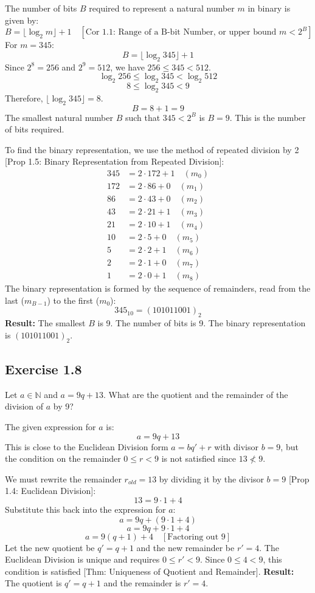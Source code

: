 \begin{solution}
The number of bits $B$ required to represent a natural number $m$ in binary is given by:
$$B = \lfloor \log_2 m \rfloor + 1 \quad [\text{Cor 1.1: Range of a B-bit Number, or upper bound } m < 2^B]$$
For $m=345$:
$$B = \lfloor \log_2 345 \rfloor + 1$$
Since $2^8 = 256$ and $2^9 = 512$, we have $256 \le 345 < 512$.
$$\log_2 256 \le \log_2 345 < \log_2 512$$
$$8 \le \log_2 345 < 9$$
Therefore, $\lfloor \log_2 345 \rfloor = 8$.
$$B = 8 + 1 = 9$$
The smallest natural number $B$ such that $345 < 2^B$ is $B=9$. This is the number of bits required.

To find the binary representation, we use the method of repeated division by 2 [Prop 1.5: Binary Representation from Repeated Division]:
\begin{align*}
    345 &= 2 \cdot 172 + 1 \quad (m_0) \\
    172 &= 2 \cdot 86 + 0 \quad (m_1) \\
    86 &= 2 \cdot 43 + 0 \quad (m_2) \\
    43 &= 2 \cdot 21 + 1 \quad (m_3) \\
    21 &= 2 \cdot 10 + 1 \quad (m_4) \\
    10 &= 2 \cdot 5 + 0 \quad (m_5) \\
    5 &= 2 \cdot 2 + 1 \quad (m_6) \\
    2 &= 2 \cdot 1 + 0 \quad (m_7) \\
    1 &= 2 \cdot 0 + 1 \quad (m_8)
\end{align*}
The binary representation is formed by the sequence of remainders, read from the last ($m_{B-1}$) to the first ($m_0$):
$$345_{10} = (101011001)_2$$
\textbf{Result:} The smallest $B$ is 9. The number of bits is 9. The binary representation is $(101011001)_2$.
\end{solution}
\newpage
\subsection*{Exercise 1.8}
Let $a \in \mathbb{N}$ and $a = 9q + 13$. What are the quotient and the remainder of the division of $a$ by 9?

\begin{solution}
The given expression for $a$ is:
$$a = 9q + 13$$
This is close to the Euclidean Division form $a = bq' + r$ with divisor $b=9$, but the condition on the remainder $0 \le r < 9$ is not satisfied since $13 \not< 9$.

We must rewrite the remainder $r_{old} = 13$ by dividing it by the divisor $b=9$ [Prop 1.4: Euclidean Division]:
$$13 = 9 \cdot 1 + 4$$
Substitute this back into the expression for $a$:
$$a = 9q + (9 \cdot 1 + 4)$$
$$a = 9q + 9 \cdot 1 + 4$$
$$a = 9(q + 1) + 4 \quad [\text{Factoring out } 9]$$
Let the new quotient be $q' = q+1$ and the new remainder be $r' = 4$.
The Euclidean Division is unique and requires $0 \le r' < 9$. Since $0 \le 4 < 9$, this condition is satisfied [Thm: Uniqueness of Quotient and Remainder].
\textbf{Result:} The quotient is $q' = q+1$ and the remainder is $r' = 4$.
\end{solution}
\newpage
